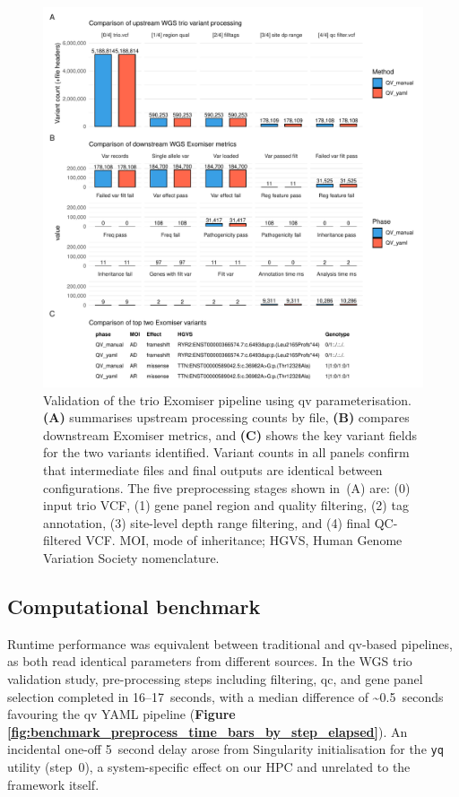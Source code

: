 \begin{figure}[h]
\centering
\includegraphics[width=\textwidth]{./images/qv_exomiser/exomiser_validation_bars_facet_metric.pdf}
\caption{Validation of the trio Exomiser pipeline using \ac{qv} parameterisation. 
\textbf{(A)} summarises upstream processing counts by file, 
\textbf{(B)} compares downstream Exomiser metrics, 
and \textbf{(C)} shows the key variant fields for the two variants identified. 
Variant counts in all panels confirm that intermediate files and final outputs are identical between configurations. 
The five preprocessing stages shown in~(A) are: 
(0) input trio VCF, (1) gene panel region and quality filtering, (2) tag annotation, (3) site-level depth range filtering, and (4) final QC-filtered VCF. 
MOI, mode of inheritance; HGVS, Human Genome Variation Society nomenclature.}
\label{fig:qv_exomiser_validation}
\end{figure}

\FloatBarrier
\subsection{Computational benchmark}\label{sec:benchmark}
Runtime performance was equivalent between traditional and \ac{qv}-based pipelines, as both read identical parameters from different sources. In the WGS trio validation study, pre-processing steps including filtering, \ac{qc}, and gene panel selection completed in 16–17~seconds, with a median difference of \textasciitilde0.5~seconds favouring the \ac{qv} YAML pipeline (\textbf{Figure \ref{fig:benchmark_preprocess_time_bars_by_step_elapsed}}). An incidental one-off 5~second delay arose from Singularity initialisation for the \texttt{yq} utility (step~0), a system-specific effect on our HPC and unrelated to the framework itself.

